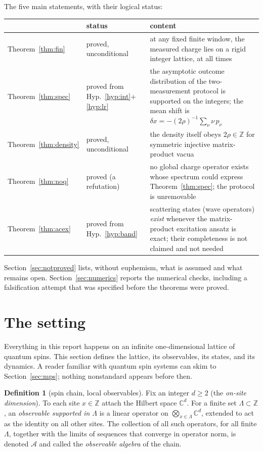 \documentclass[11pt]{article}
\theoremstyle{definition}
\newtheorem{definition}[theorem]{Definition}
\theoremstyle{remark}
\newcommand{\A}{\mathcal{A}}
\newcommand{\Z}{\mathbb{Z}}
\newcommand{\C}{\mathbb{C}}
\begin{document}
The five main statements, with their logical status:

\begin{center}
\begin{tabular}{@{}llp{7.8cm}@{}}
\toprule
 & status & content \\
\midrule
Theorem~\ref{thm:fin} & proved, unconditional & at any fixed finite window,
the measured charge lies on a rigid integer lattice, at all times \\
Theorem~\ref{thm:spec} & proved from Hyp.~\ref{hyp:int}+\ref{hyp:lr} &
the asymptotic outcome distribution of the two-measurement protocol is
supported on the integers; the mean shift is
$\delta x = -(2\rho)^{-1}\sum_\nu \nu\, p_\nu$ \\
Theorem~\ref{thm:density} & proved, unconditional & the density itself obeys
$2\rho\in\Z$ for symmetric injective matrix-product vacua \\
Theorem~\ref{thm:noq} & proved (a refutation) & no global charge operator
exists whose spectrum could express Theorem~\ref{thm:spec}; the protocol is
unremovable \\
Theorem~\ref{thm:acex} & proved from Hyp.~\ref{hyp:band} & scattering states
(wave operators) \emph{exist} whenever the matrix-product excitation ansatz is
exact; their completeness is not claimed and not needed \\
\bottomrule
\end{tabular}
\end{center}

Section~\ref{sec:notproved} lists, without euphemism, what is assumed and what
remains open.  Section~\ref{sec:numerics} reports the numerical checks,
including a falsification attempt that was specified before the theorems were
proved.

\section{The setting}\label{sec:setting}

Everything in this report happens on an infinite one-dimensional lattice of
quantum spins.  This section defines the lattice, its observables, its states,
and its dynamics.  A reader familiar with quantum spin systems can skim to
Section~\ref{sec:mps}; nothing nonstandard appears before then.

\begin{definition}[spin chain, local observables]\label{def:chain}
Fix an integer $d\ge 2$ (the \emph{on-site dimension}).  To each site
$x\in\Z$ attach the Hilbert space $\C^d$.  For a finite set
$\Lambda\subset\Z$, an \emph{observable supported in $\Lambda$} is a linear
operator on $\bigotimes_{x\in\Lambda}\C^d$, extended to act as the identity on
all other sites.  The collection of all such operators, for all finite
$\Lambda$, together with the limits of sequences that converge in operator
norm, is denoted $\A$ and called the \emph{observable algebra} of the chain.
\end{definition}
\end{document}
